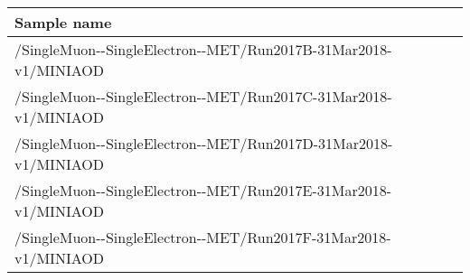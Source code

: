 \scriptsize
\begin{tabular}{lrr}
  \hline
  \textbf{Sample name} \\
  \hline
  \ttfamily /SingleMuon-{}-SingleElectron-{}-MET/Run2017B-31Mar2018-v1/MINIAOD \\
  \ttfamily /SingleMuon-{}-SingleElectron-{}-MET/Run2017C-31Mar2018-v1/MINIAOD \\
  \ttfamily /SingleMuon-{}-SingleElectron-{}-MET/Run2017D-31Mar2018-v1/MINIAOD \\
  \ttfamily /SingleMuon-{}-SingleElectron-{}-MET/Run2017E-31Mar2018-v1/MINIAOD \\
  \ttfamily /SingleMuon-{}-SingleElectron-{}-MET/Run2017F-31Mar2018-v1/MINIAOD \\
  \hline
\end{tabular}
